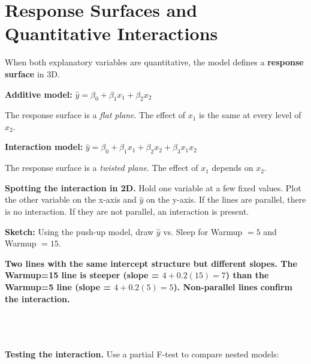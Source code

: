 \documentclass[12pt]{article}
\newcommand{\ans}[1]{%
    \ifthenelse{\boolean{showanswers}}%
        {\textcolor{rhodamine}{\textbf{#1}}}%
        {\textcolor{white}{\textbf{#1}}}%
}
\begin{document}
\newpage
\section*{Response Surfaces and Quantitative Interactions}

\noindent
When both explanatory variables are quantitative, the model defines a \textbf{response surface} in 3D.

\vspace{0.3cm}

\begin{frameworkbox}
\textbf{Additive model:} $\hat{y} = \beta_0 + \beta_1 x_1 + \beta_2 x_2$

The response surface is a \textit{flat plane}. The effect of $x_1$ is the same at every level of $x_2$.

\vspace{0.3cm}

\textbf{Interaction model:} $\hat{y} = \beta_0 + \beta_1 x_1 + \beta_2 x_2 + \beta_3 x_1 x_2$

The response surface is a \textit{twisted plane}. The effect of $x_1$ depends on $x_2$.
\end{frameworkbox}

\vspace{0.3cm}

\noindent
\textbf{Spotting the interaction in 2D.} Hold one variable at a few fixed values. Plot the other variable on the x-axis and $\hat{y}$ on the y-axis. If the lines are parallel, there is no interaction. If they are not parallel, an interaction is present.

\vspace{0.5cm}

\noindent
\textbf{Sketch:} Using the push-up model, draw $\hat{y}$ vs. Sleep for Warmup $= 5$ and Warmup $= 15$.

\vspace{3.5cm}

\ans{Two lines with the same intercept structure but different slopes. The Warmup=15 line is steeper (slope = $4 + 0.2(15) = 7$) than the Warmup=5 line (slope = $4 + 0.2(5) = 5$). Non-parallel lines confirm the interaction.}

\vspace{0.3cm}

\noindent
\textbf{Testing the interaction.} Use a partial F-test to compare nested models:
\end{document}
